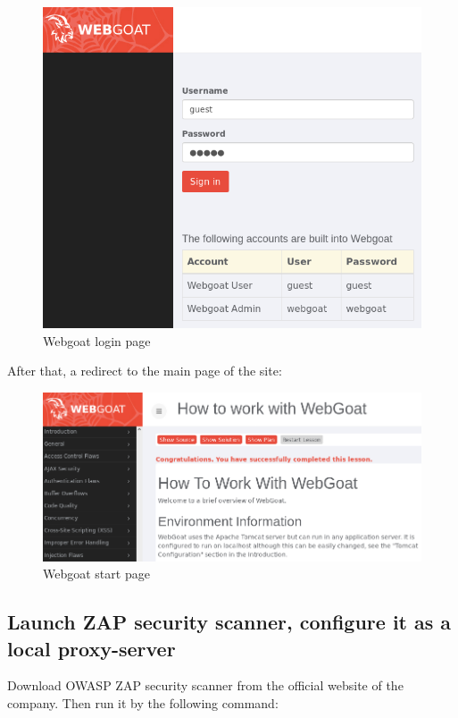 \documentclass[14pt,a4paper,report]{report}
\begin{document}
\begin{figure}[h!]
	\centering
	\includegraphics[scale = 0.65]{images/1.png}
	\caption{Webgoat login page}
\end{figure}

After that, a redirect to the main page of the site:

\begin{figure}[h!]
	\centering
	\includegraphics[scale = 0.65]{images/2.png}
	\caption{Webgoat start page}
\end{figure}

\subsection{Launch ZAP security scanner, configure it as a local proxy-server}

Download OWASP ZAP security scanner from the official website of the company. Then run it by the following command:
\end{document}

